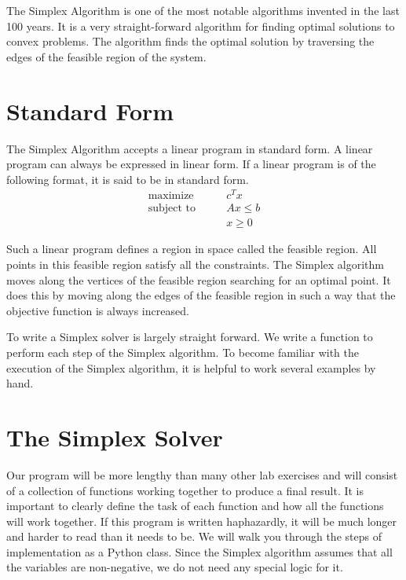 \label{lab:Simplex}

The Simplex Algorithm is one of the most notable algorithms invented in the last 100 years.
It is a very straight-forward algorithm for finding optimal solutions to convex problems.
The algorithm finds the optimal solution by traversing the edges of the feasible region of the system.

\section{Standard Form}
The Simplex Algorithm accepts a linear program in standard form.
A linear program can always be expressed in linear form.
If a linear program is of the following format, it is said to be in standard form.
\begin{align*}
\text{maximize}\qquad & c^T x \\
\text{subject to}\qquad & A x \leq b \\
 & x \geq 0
\end{align*}

Such a linear program defines a region in space called the feasible region.
All points in this feasible region satisfy all the constraints.
The Simplex algorithm moves along the vertices of the feasible region searching for an optimal point.
It does this by moving along the edges of the feasible region in such a way that the objective function is always increased.

To write a Simplex solver is largely straight forward.
We write a function to perform each step of the Simplex algorithm.
To become familiar with the execution of the Simplex algorithm, it is helpful to work several examples by hand.

\section*{The Simplex Solver}
Our program will be more lengthy than many other lab exercises and will consist of a collection of functions working together to produce a final result.
It is important to clearly define the task of each function and how all the functions will work together.
If this program is written haphazardly, it will be much longer and harder to read than it needs to be.
We will walk you through the steps of implementation as a Python class.
Since the Simplex algorithm assumes that all the variables are non-negative, we do not need any special logic for it.

